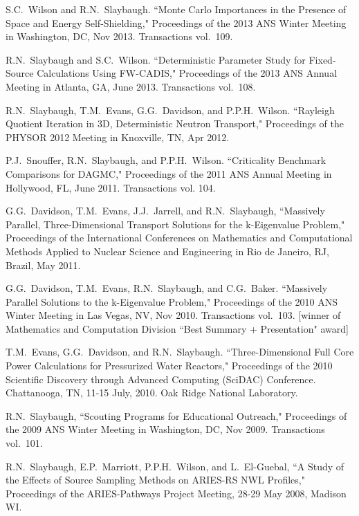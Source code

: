 \begin{bibsection}
\item S.C.\ Wilson and R.N.\ Slaybaugh. ``Monte Carlo Importances in the Presence of Space and Energy Self-Shielding," Proceedings of the 2013 ANS Winter Meeting in Washington, DC, Nov 2013. Transactions vol.\ 109.

\item R.N.\ Slaybaugh and  S.C.\ Wilson. ``Deterministic Parameter Study for Fixed-Source Calculations Using FW-CADIS," Proceedings of the 2013 ANS Annual Meeting in Atlanta, GA, June 2013. Transactions vol.\ 108.

\item R.N.\ Slaybaugh, T.M.\ Evans, G.G.\ Davidson, and P.P.H.\ Wilson. ``Rayleigh Quotient Iteration in 3D, Deterministic Neutron Transport," Proceedings of the PHYSOR 2012 Meeting in Knoxville, TN, Apr 2012.

\item P.J.\ Snouffer, R.N.\ Slaybaugh, and P.P.H.\ Wilson. ``Criticality Benchmark Comparisons for DAGMC," Proceedings of the 2011 ANS Annual Meeting in Hollywood, FL, June 2011. Transactions vol. 104.

\item G.G.\ Davidson, T.M.\ Evans, J.J.\ Jarrell, and R.N.\ Slaybaugh, ``Massively Parallel, Three-Dimensional Transport Solutions for the k-Eigenvalue Problem," Proceedings of the International Conferences on Mathematics and Computational Methods Applied to Nuclear Science and Engineering in Rio de Janeiro, RJ, Brazil, May 2011.

\item G.G.\ Davidson, T.M.\ Evans, R.N.\ Slaybaugh, and C.G.\ Baker.  ``Massively Parallel Solutions to the k-Eigenvalue Problem," Proceedings of the 2010 ANS Winter Meeting in Las Vegas, NV, Nov 2010. Transactions vol.\ 103. [winner of Mathematics and Computation Division ``Best Summary + Presentation" award]

\item T.M.\ Evans, G.G.\ Davidson, and R.N.\ Slaybaugh.  ``Three-Dimensional Full Core Power Calculations for Pressurized Water Reactors," Proceedings of the 2010 Scientific Discovery through Advanced Computing (SciDAC) Conference. Chattanooga, TN, 11-15 July, 2010. Oak Ridge National Laboratory.

\item R.N.\ Slaybaugh, ``Scouting Programs for Educational Outreach," Proceedings of the 2009 ANS Winter Meeting in Washington, DC, Nov 2009. Transactions vol.\ 101.

\item R.N.\ Slaybaugh, E.P.\ Marriott, P.P.H.\ Wilson, and L.\ El-Guebal, ``A Study of the Effects of Source Sampling Methods on ARIES-RS NWL Profiles," Proceedings of the ARIES-Pathways Project Meeting, 28-29 May 2008, Madison WI. 


\end{bibsection}
